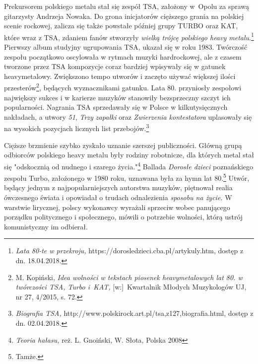 \documentclass[12pt, a4paper, titlepage]{report}
\begin{document}
Prekursorem polskiego metalu stał się zespół TSA, założony w~Opolu za sprawą gitarzysty Andrzeja Nowaka. Do grona inicjatorów cięższego grania na polskiej scenie rockowej, zalicza się także powstałe później grupy TURBO oraz KAT, które wraz z TSA, zdaniem fanów stworzyły \textit{wielką trójcę polskiego heavy metalu}.\footnote{\textit{Lata 80-te w przekroju,} https://dorosledzieci.cba.pl/artykuly.htm, dostęp z dn. 18.04.2018.} Pierwszy album studyjny ugrupowania TSA, ukazał się w roku 1983. Twórczość zespołu początkowo oscylowała w rytmach muzyki hardrockowej, ale z czasem tworzone przez TSA kompozycje coraz bardziej wpisywały się w gatunek heavymetalowy. Zwiększono tempo utworów i zaczęto używać większej ilości przesterów\footnote{M. Kopiński, \textit{Idea wolności w tekstach piosenek heavymetalowych lat 80. w twórczości TSA, Turbo i~KAT,} [w:]~Kwartalnik Młodych Muzykologów UJ, nr 27, 4/2015, s. 72.}, będących wyznacznikami gatunku. Lata 80. przyniosły zespołowi największy sukces i w karierze muzyków stanowiły bezsprzeczny szczyt ich popularności. Nagrania TSA sprzedawały się w Polsce w kilkutysięcznych nakładach, a utwory \textit{51}, \textit{Trzy zapałki} oraz \textit{Zwierzenia kontestatora} uplasowały się na wysokich pozycjach licznych list przebojów.\footnote{\textit{Biografia TSA,} http://www.polskirock.art.pl/tsa,z127,biografia.html, dostęp z dn. 02.04.2018.} 

Cięższe brzmienie szybko zyskało uznanie szerszej publiczności. Główną grupą odbiorców polskiego heavy metalu były rodziny robotnicze, dla których metal stał się "odskocznią od nudnego i szarego życia."\footnote{\textit{Teoria hałasu,} reż. L. Gnoiński, W. Słota, Polska 2008} Ballada \textit{Dorosłe dzieci} poznańskiego zespołu Turbo, założonego w 1980 roku, uznawana była za hymn lat 80.\footnote{Tamże.} Utwór, będący jednym z najpopularniejszych autorstwa muzyków, piętnował realia ówczesnego świata i opowiadał o trudach odnalezienia \textit{sposobu na życie.} W warstwie lirycznej, polscy wykonawcy wyrażali sprzeciw wobec panującego porządku politycznego i społecznego, mówili o potrzebie wolności, którą ustrój komunistyczny im odbierał.
\end{document}
